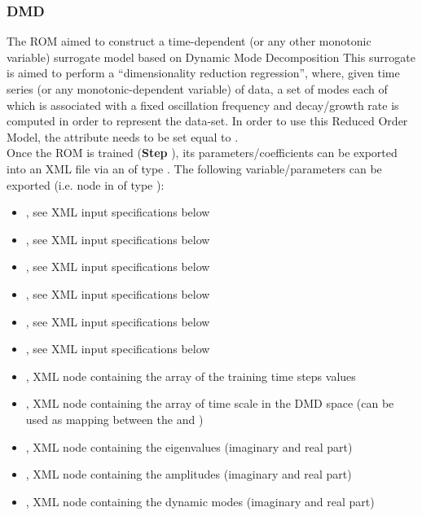 \subsubsection{DMD}
  The  ROM aimed to construct a time-dependent (or any other monotonic
  variable) surrogate model based on Dynamic Mode Decomposition         This surrogate is aimed to
  perform a ``dimensionality reduction regression'', where, given time         series (or any
  monotonic-dependent variable) of data, a set of modes each of which is associated         with a
  fixed oscillation frequency and decay/growth rate is computed         in order to represent the
  data-set.         In order to use this Reduced Order Model, the  attribute
   needs to be set equal to .         \\         Once the ROM  is
  trained (\textbf{Step} ), its parameters/coefficients can be exported into an
  XML file         via an  of type . The following
  variable/parameters can be exported (i.e.  node         in  of
  type ):         \begin{itemize}           \item {}, see XML input
  specifications below           \item {}, see XML input specifications below
  \item {}, see XML input specifications below           \item {},
  see XML input specifications below           \item {}, see XML input
  specifications below           \item {}, see XML input specifications below
  \item {}, XML node containing the array of the training time steps values
  \item {}, XML node containing the array of time scale in the DMD space (can be
  used as mapping           between the   and )
  \item {}, XML node containing the eigenvalues (imaginary and real part)
  \item {}, XML node containing the amplitudes (imaginary and real part)
  \item {}, XML node containing the dynamic modes (imaginary and real part)
  \end{itemize}

